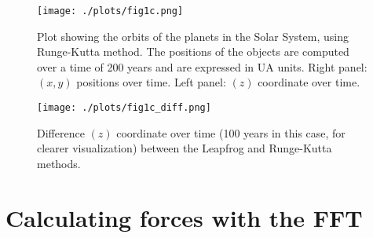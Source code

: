 \begin{figure}[h!]
    \centering
    \texttt{[image: ./plots/fig1c.png]}
    \caption{Plot showing the orbits of the planets in the Solar System, using Runge-Kutta method.
    The positions of the objects are computed over a time of 200 years and are expressed in UA units. Right panel: $(x,y)$ positions over time. Left panel: $(z)$ coordinate over time.} 
    \label{fig:fig1b}
  \end{figure}

  \begin{figure}[h!]
    \centering
    \texttt{[image: ./plots/fig1c\_diff.png]}
    \caption{Difference $(z)$ coordinate over time (100 years in this case, for clearer visualization) between the Leapfrog and Runge-Kutta methods.} 
    \label{fig:fig1bzoom}
  \end{figure}

\section{Calculating forces with the FFT}